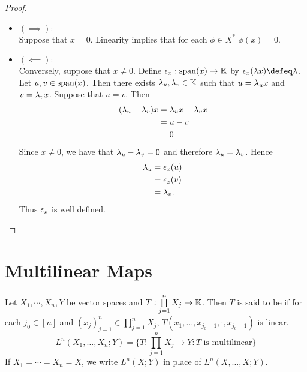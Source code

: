 \documentclass{book}
\begin{document}
	\begin{proof}\
		\begin{itemize}
			\item $(\implies):$ \\
			Suppose that $x = 0$. Linearity implies that for each $\phi \in X^*$ $\phi(x) = 0$. 
			\item $(\impliedby):$ \\
			Conversely, suppose that $x \neq 0$. Define $\epsilon_x: \operatorname{span}(x) \rightarrow \mathbb{K}$ by $\ep_x(\lam x) \defeq \lam$. Let $u,v \in \operatorname{span}(x)$. Then there exists $\lambda_u, \lambda_v \in \mathbb{K}$ such that $u = \lambda_u x$ and $v = \lambda_v x$. Suppose that $u = v$. Then 
			\begin{align*}
				(\lambda_u - \lambda_v)x
				& = \lambda_u x - \lambda_v x \\
				& = u - v \\
				& = 0
			\end{align*}
			Since $x \neq 0$, we have that $\lambda_u - \lambda_v = 0$ and therefore $\lambda_u = \lambda_v$. Hence  
			\begin{align*}
				\lambda_u 
				& = \epsilon_x(u) \\
				& = \epsilon_x(v) \\
				& = \lambda_v.
			\end{align*}
			Thus $\epsilon_x$ is well defined. 
		\end{itemize}
	\end{proof}



































	\newpage
	\section{Multilinear Maps}

	\begin{defn}
		Let $X_1, \cdots, X_n, Y$ be vector spaces and $T: \prod\limits_{j=1}^n X_j \rightarrow \mathbb{K}$. Then $T$ is said to be  if for each $j_0 \in [n]$ and $(x_j)_{j=1}^n \in \prod\limits_{j=1}^n X_j$, $T(x_1, \ldots, x_{j_0 - 1}, \cdot, x_{j_0 + 1})$ is linear. $$L^n(X_1, \dots, X_n; Y) = \bigg\{T : \prod\limits_{j=1}^n X_j \rightarrow Y: T \text{ is multilinear}\bigg \}$$ 
		If $X_1 = \cdots = X_n = X$, we write $L^n(X;Y)$ in place of $L^n (X, \dots, X; Y) $. 
	\end{defn}
\end{document}
